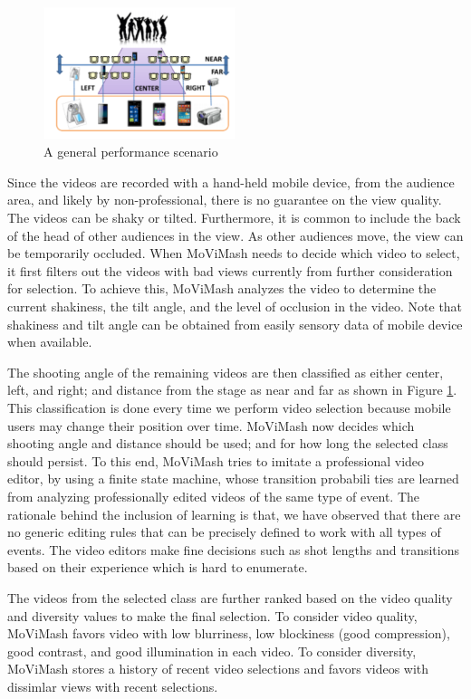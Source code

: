 \documentclass{sig-alternate}
\begin{document}
\begin{figure}[h]
    \centering
    \includegraphics[width=0.5\textwidth]{img1.png}
    \caption{A general performance scenario}
    \label{fig:fig1}
\end{figure}

Since the videos are recorded with a hand-held mobile device,
from the audience area, and likely by non-professional, there is no
guarantee on the view quality. The videos can be shaky or tilted.
Furthermore, it is common to include the back of the head of other
audiences in the view. As other audiences move, the view can be
temporarily occluded. When MoViMash needs to decide which
video to select, it first filters out the videos with bad views currently from further consideration for selection. To achieve this, MoViMash analyzes the video to determine the current shakiness, the tilt angle, and the level of occlusion in the video. Note that shakiness and tilt angle can be obtained from easily sensory data of mobile device when available.



The shooting angle of the remaining videos are then classified as
either center, left, and right; and distance from the stage as near and
far as shown in Figure \ref{fig:fig1}. This classification is done every time we perform video selection because mobile users may change their position over time. MoViMash now decides which shooting angle and distance should be used; and for how long the selected class should persist. To this end, MoViMash tries to imitate a professional video editor, by using a finite state machine, whose transition probabili ties are learned from analyzing professionally edited videos of the same type of event. The rationale behind the inclusion of learning is that, we have observed that there are no generic editing rules that can be precisely defined to work with all types of events. The video editors make fine decisions such as shot lengths and transitions based on their experience which is hard to enumerate.

The videos from the selected class are further ranked based on
the video quality and diversity values to make the final selection. To consider video quality, MoViMash favors video with low blurriness, low blockiness (good compression), good contrast, and good illumination in each video. To consider diversity, MoViMash stores a history of recent video selections and favors videos with dissimlar views with recent selections.
\end{document}
